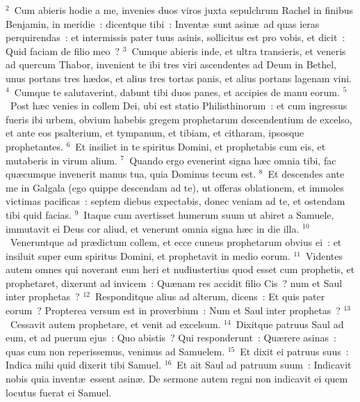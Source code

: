 ${}^{2}$~Cum abieris hodie a me, invenies duos viros juxta sepulchrum Rachel in finibus Benjamin, in meridie~: dicentque tibi~: Invent\ae\ sunt asin\ae\ ad quas ieras perquirendas~: et intermissis pater tuus asinis, sollicitus est pro vobis, et dicit~: Quid faciam de filio meo~?
${}^{3}$~Cumque abieris inde, et ultra transieris, et veneris ad quercum Thabor, invenient te ibi tres viri ascendentes ad Deum in Bethel, unus portans tres h\ae dos, et alius tres tortas panis, et alius portans lagenam vini.
${}^{4}$~Cumque te salutaverint, dabunt tibi duos panes, et accipies de manu eorum.
${}^{5}$~Post h\ae c venies in collem Dei, ubi est statio Philisthinorum~: et cum ingressus fueris ibi urbem, obvium habebis gregem prophetarum descendentium de excelso, et ante eos psalterium, et tympanum, et tibiam, et citharam, ipsosque prophetantes.
${}^{6}$~Et insiliet in te spiritus Domini, et prophetabis cum eis, et mutaberis in virum alium.
${}^{7}$~Quando ergo evenerint signa h\ae c omnia tibi, fac qu\ae cumque invenerit manus tua, quia Dominus tecum est.
${}^{8}$~Et descendes ante me in Galgala (ego quippe descendam ad te), ut offeras oblationem, et immoles victimas pacificas~: septem diebus expectabis, donec veniam ad te, et ostendam tibi quid facias.
${}^{9}$~Itaque cum avertisset humerum suum ut abiret a Samuele, immutavit ei Deus cor aliud, et venerunt omnia signa h\ae c in die illa.
${}^{10}$~Veneruntque ad pr\ae dictum collem, et ecce cuneus prophetarum obvius ei~: et insiluit super eum spiritus Domini, et prophetavit in medio eorum.
${}^{11}$~Videntes autem omnes qui noverant eum heri et nudiustertius quod esset cum prophetis, et prophetaret, dixerunt ad invicem~: Qu\ae nam res accidit filio Cis~? num et Saul inter prophetas~?
${}^{12}$~Responditque alius ad alterum, dicens~: Et quis pater eorum~? Propterea versum est in proverbium~: Num et Saul inter prophetas~?
${}^{13}$~Cessavit autem prophetare, et venit ad excelsum.
${}^{14}$~Dixitque patruus Saul ad eum, et ad puerum ejus~: Quo abistis~? Qui responderunt~: Qu\ae rere asinas~: quas cum non reperissemus, venimus ad Samuelem.
${}^{15}$~Et dixit ei patruus suus~: Indica mihi quid dixerit tibi Samuel.
${}^{16}$~Et ait Saul ad patruum suum~: Indicavit nobis quia invent\ae\ essent asin\ae . De sermone autem regni non indicavit ei quem locutus fuerat ei Samuel.


